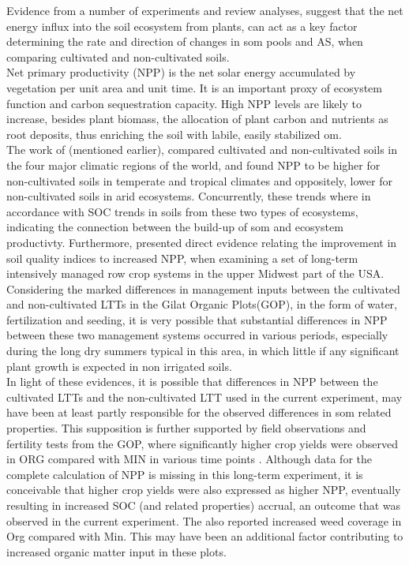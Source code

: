 	Evidence from a number of experiments and review analyses, suggest that the net energy influx into the soil ecosystem from plants, can act as a key factor determining the rate and direction of changes in \gls{som} pools  and AS, when comparing cultivated and non-cultivated soils. \\
	Net primary productivity (NPP) is the net solar energy accumulated by vegetation per unit area and unit time. It is an important proxy of ecosystem function and carbon sequestration capacity\citep{jackson2016}. High NPP levels are likely to increase, besides plant biomass, the allocation of plant carbon and nutrients as root deposits, thus enriching the soil with labile, easily stabilized \gls{om}.  \\
	The work of \citet{trivedi2016} (mentioned earlier), compared cultivated and non-cultivated soils in the four major climatic regions of the world, and found NPP to be higher for non-cultivated soils in temperate and tropical climates and oppositely, lower for non-cultivated soils in arid ecosystems. Concurrently, these trends where in accordance with SOC trends in soils from these two types of ecosystems, indicating the connection between the build-up of \gls{som}  and ecosystem productivty. Furthermore, \citet{bhardwaj2011} presented direct evidence relating the improvement in soil quality indices to increased NPP, when examining a set of long-term intensively managed row crop systems in the upper Midwest part of the USA.\\
	Considering the marked differences in management inputs between the cultivated and non-cultivated LTTs in the Gilat Organic Plots(GOP), in the form of water, fertilization and seeding, it is very possible that substantial differences in NPP between these two management systems occurred in various periods, especially during the long dry summers typical in this area, in which little  if any significant plant growth is expected in non irrigated soils. \\
	In light of these evidences, it is possible that differences in NPP between the cultivated LTTs and the non-cultivated LTT used in the current experiment, may have been at least partly responsible for the observed differences in \gls{som} related properties.
	This supposition is further supported by field observations and fertility tests from the GOP, where significantly higher crop yields were observed in ORG compared with MIN in various time points . Although data for the complete calculation of NPP is missing in this long-term experiment, it is conceivable that higher crop yields were also expressed as higher NPP, eventually resulting in increased SOC (and related properties) accrual, an outcome that was observed in the current experiment. The  also reported increased weed coverage in Org compared with Min. This may have been an additional factor contributing to increased organic matter input in these plots.\\
